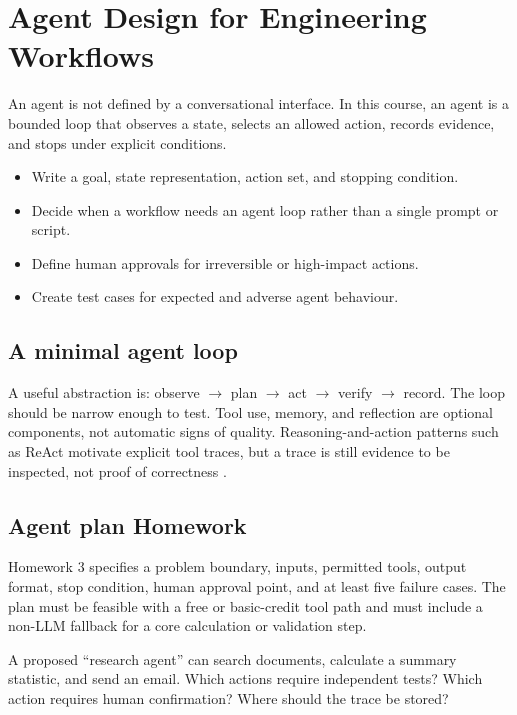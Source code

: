 \chapter{Agent Design for Engineering Workflows}\label{chap:agents}
 An agent is not defined by a conversational interface. In this course, an agent is a bounded loop that observes a state, selects an allowed action, records evidence, and stops under explicit conditions.

\begin{learningbox}
\begin{itemize}
  \item Write a goal, state representation, action set, and stopping condition.
  \item Decide when a workflow needs an agent loop rather than a single prompt or script.
  \item Define human approvals for irreversible or high-impact actions.
  \item Create test cases for expected and adverse agent behaviour.
\end{itemize}
\end{learningbox}

\section{A minimal agent loop}
A useful abstraction is: observe $\rightarrow$ plan $\rightarrow$ act $\rightarrow$ verify $\rightarrow$ record. The loop should be narrow enough to test. Tool use, memory, and reflection are optional components, not automatic signs of quality. Reasoning-and-action patterns such as ReAct motivate explicit tool traces, but a trace is still evidence to be inspected, not proof of correctness \citep{yao2023}.

\section{Agent plan Homework}
Homework 3 specifies a problem boundary, inputs, permitted tools, output format, stop condition, human approval point, and at least five failure cases. The plan must be feasible with a free or basic-credit tool path and must include a non-LLM fallback for a core calculation or validation step.

\begin{checkpointbox}
A proposed ``research agent'' can search documents, calculate a summary statistic, and send an email. Which actions require independent tests? Which action requires human confirmation? Where should the trace be stored?
\end{checkpointbox}

